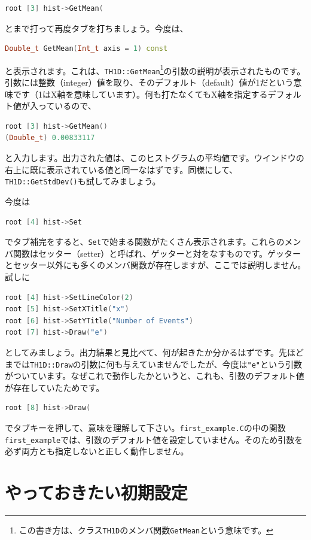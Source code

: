 \begin{lstlisting}[language=c++]
root [3] hist->GetMean(
\end{lstlisting}
とまで打って再度タブを打ちましょう。今度は、
\begin{lstlisting}[language=c++]
Double_t GetMean(Int_t axis = 1) const
\end{lstlisting}
と表示されます。これは、\texttt{TH1D::GetMean}\footnote{この書き方は、クラス\texttt{TH1D}のメンバ関数\texttt{GetMean}という意味です。}の引数の説明が表示されたものです。引数には整数（integer）値を取り、そのデフォルト（default）値が1だという意味です（1はX軸を意味しています）。何も打たなくてもX軸を指定するデフォルト値が入っているので、
\begin{lstlisting}[language=c++]
root [3] hist->GetMean()
(Double_t) 0.00833117
\end{lstlisting}
と入力します。出力された値は、このヒストグラムの平均値です。ウインドウの右上に既に表示されている値と同一なはずです。同様にして、\texttt{TH1D::GetStdDev()}も試してみましょう。

今度は
\begin{lstlisting}[language=c++]
root [4] hist->Set
\end{lstlisting}
でタブ補完をすると、\texttt{Set}で始まる関数がたくさん表示されます。これらのメンバ関数はセッター（setter）と呼ばれ、ゲッターと対をなすものです。ゲッターとセッター以外にも多くのメンバ関数が存在しますが、ここでは説明しません。試しに
\begin{lstlisting}[language=c++]
root [4] hist->SetLineColor(2)
root [5] hist->SetXTitle("x")
root [6] hist->SetYTitle("Number of Events")
root [7] hist->Draw("e")
\end{lstlisting}
としてみましょう。出力結果と見比べて、何が起きたか分かるはずです。先ほどまでは\texttt{TH1D::Draw}の引数に何も与えていませんでしたが、今度は\texttt{"e"}という引数がついています。なぜこれで動作したかというと、これも、引数のデフォルト値が存在していたためです。
\begin{lstlisting}[language=c++]
root [8] hist->Draw(
\end{lstlisting}
でタブキーを押して、意味を理解して下さい。\texttt{first\_example.C}の中の関数\texttt{first\_example}では、引数のデフォルト値を設定していません。そのため引数を必ず両方とも指定しないと正しく動作しません。

\section{やっておきたい初期設定}

